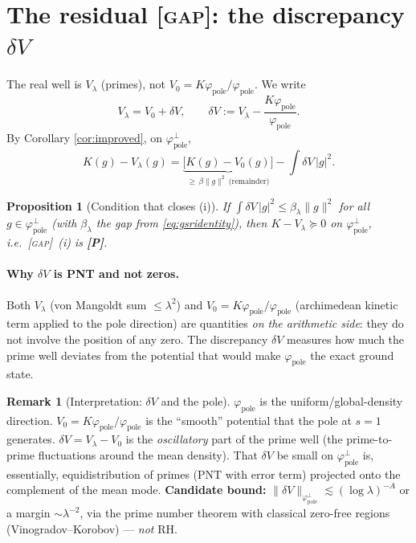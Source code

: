 \documentclass[11pt]{article}
\newcommand{\PR}{\textcolor{green!55!black}{\textbf{[P]}}}
\newcommand{\GAP}{\textcolor{red!75!black}{\textsc{[gap]}}}
\theoremstyle{plain}
\newtheorem{proposition}{Proposition}
\theoremstyle{definition}
\newtheorem{remark}{Remark}
\newcommand{\kin}{K}
\newcommand{\vv}{V}
\newcommand{\fp}{\varphi_{\mathrm{pole}}}
\begin{document}
\section{The residual \GAP: the discrepancy $\delta\vv$}\label{sec:discrepancy}

The real well is $\vv_\lambda$ (primes), not $\vv_0=\kin\fp/\fp$. We write
\begin{equation}\label{eq:dV}
  \vv_\lambda=\vv_0+\delta\vv,\qquad \delta\vv:=\vv_\lambda-\frac{\kin\fp}{\fp}.
\end{equation}
By Corollary \ref{cor:improved}, on $\fp^\perp$,
\[
  \kin(g)-\vv_\lambda(g)
  =\underbrace{\bigl[\kin(g)-\vv_0(g)\bigr]}_{\ge\,\beta\|g\|^2\ \text{(remainder)}}
  -\int\delta\vv\,|g|^2 .
\]

\begin{proposition}[Condition that closes (i)]\label{prop:close}
If $\displaystyle \int\delta\vv\,|g|^2\le \beta_\lambda\|g\|^2$ for all
$g\in\fp^\perp$ (with $\beta_\lambda$ the gap from \eqref{eq:gsridentity}), then
$\kin-\vv_\lambda\succeq0$ on $\fp^\perp$, i.e.\ \GAP\ (i) is \PR.
\end{proposition}

\paragraph{Why $\delta\vv$ is PNT and not zeros.} Both $\vv_\lambda$ (von Mangoldt sum
$\le\lambda^2$) and $\vv_0=\kin\fp/\fp$ (archimedean kinetic term applied to the
pole direction) are quantities \emph{on the arithmetic side}: they do not involve the
position of any zero. The discrepancy $\delta\vv$ measures how much the prime well
deviates from the potential that would make $\fp$ the exact ground state.

\begin{remark}[Interpretation: $\delta\vv$ and the pole]
$\fp$ is the uniform/global-density direction. $\vv_0=\kin\fp/\fp$ is the ``smooth''
potential that the pole at $s=1$ generates. $\delta\vv=\vv_\lambda-\vv_0$ is the
\emph{oscillatory} part of the prime well (the prime-to-prime fluctuations around the
mean density). That $\delta\vv$ be small on $\fp^\perp$ is, essentially,
equidistribution of primes (PNT with error term) projected onto the complement of the
mean mode. \textbf{Candidate bound:} $\|\delta\vv\|_{\fp^\perp}\lesssim
(\log\lambda)^{-A}$ or a margin $\sim\lambda^{-2}$, via the prime number theorem with
classical zero-free regions (Vinogradov--Korobov) --- \emph{not} RH.
\end{remark}
\end{document}
